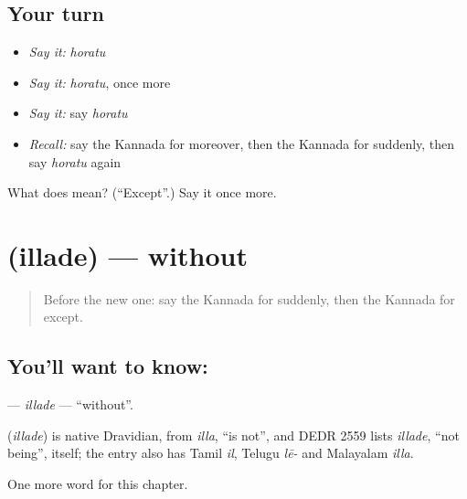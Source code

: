 \subsection*{Your turn}
\begin{itemize}
\raggedright
  \item \emph{Say it:} \emph{horatu}
  \item \emph{Say it:} \emph{horatu}, once more
  \item \emph{Say it:} say \emph{horatu}
  \item \emph{Recall:} say the Kannada for moreover, then the Kannada for suddenly, then say \emph{horatu} again
\end{itemize}

\begin{tcolorbox}[breakable,colback=teal!4,colframe=teal!35!black,title={Before you move on}]
What does  mean? (\textquotedblleft{}Except\textquotedblright{}.) Say it once more.
\end{tcolorbox}
\section[\texorpdfstring{\kn{ಇಲ್ಲದೆ} (illade)}{ಇಲ್ಲದೆ (illade)}]{ (illade) — without}

\label{lesson:KA-C288-illade}



\begin{quote}
Before the new one: say the Kannada for suddenly, then the Kannada for except.
\end{quote}

\subsection*{You'll want to know: }
\textbf{} — \emph{illade} — \textquotedblleft{}without\textquotedblright{}.

\begin{cousinweb}
\textbf{} (\emph{illade}) is native Dravidian, from \emph{illa}, \textquotedblleft{}is not\textquotedblright{}, and DEDR 2559 lists \emph{illade}, \textquotedblleft{}not being\textquotedblright{}, itself; the entry also has Tamil \emph{il}, Telugu \emph{lē-} and Malayalam \emph{illa}.
\end{cousinweb}

\begin{grammarlens}[title={What you've built}]
One more word for this chapter.
\end{grammarlens}

